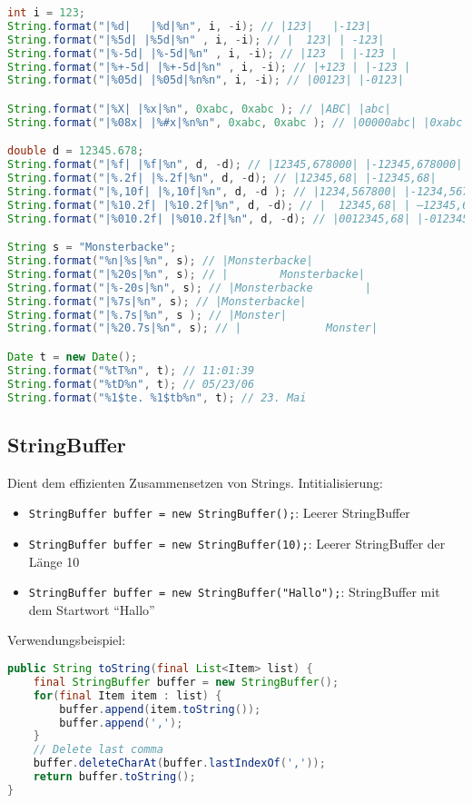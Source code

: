 \begin{lstlisting}[language=Java]
int i = 123; 
String.format("|%d|   |%d|%n", i, -i); // |123|   |-123| 
String.format("|%5d| |%5d|%n" , i, -i); // |  123| | -123| 
String.format("|%-5d| |%-5d|%n" , i, -i); // |123  | |-123 | 
String.format("|%+-5d| |%+-5d|%n" , i, -i); // |+123 | |-123 | 
String.format("|%05d| |%05d|%n%n", i, -i); // |00123| |-0123| 

String.format("|%X| |%x|%n", 0xabc, 0xabc ); // |ABC| |abc| 
String.format("|%08x| |%#x|%n%n", 0xabc, 0xabc ); // |00000abc| |0xabc| 

double d = 12345.678; 
String.format("|%f| |%f|%n", d, -d); // |12345,678000| |-12345,678000| 
String.format("|%.2f| |%.2f|%n", d, -d); // |12345,68| |-12345,68| 
String.format("|%,10f| |%,10f|%n", d, -d ); // |1234,567800| |-1234,567800| 
String.format("|%10.2f| |%10.2f|%n", d, -d); // |  12345,68| | –12345,68| 
String.format("|%010.2f| |%010.2f|%n", d, -d); // |0012345,68| |-012345,68| 

String s = "Monsterbacke"; 
String.format("%n|%s|%n", s); // |Monsterbacke| 
String.format("|%20s|%n", s); // |        Monsterbacke| 
String.format("|%-20s|%n", s); // |Monsterbacke        | 
String.format("|%7s|%n", s); // |Monsterbacke| 
String.format("|%.7s|%n", s ); // |Monster| 
String.format("|%20.7s|%n", s); // |             Monster| 

Date t = new Date(); 
String.format("%tT%n", t); // 11:01:39 
String.format("%tD%n", t); // 05/23/06 
String.format("%1$te. %1$tb%n", t); // 23. Mai 
\end{lstlisting}

\subsection{StringBuffer}
Dient dem effizienten Zusammensetzen von Strings.
Intitialisierung:
\begin{itemize}\itemsep0em
	\item \texttt{StringBuffer buffer = new StringBuffer();}: Leerer StringBuffer
	\item \texttt{StringBuffer buffer = new StringBuffer(10);}: Leerer StringBuffer der Länge 10
	\item \texttt{StringBuffer buffer = new StringBuffer("Hallo");}: StringBuffer mit dem Startwort \enquote{Hallo}
\end{itemize}

Verwendungsbeispiel:
\begin{lstlisting}[language=Java]
public String toString(final List<Item> list) {
	final StringBuffer buffer = new StringBuffer();
	for(final Item item : list) {
		buffer.append(item.toString());
		buffer.append(',');
	}
	// Delete last comma
	buffer.deleteCharAt(buffer.lastIndexOf(','));
	return buffer.toString();
}
\end{lstlisting}

